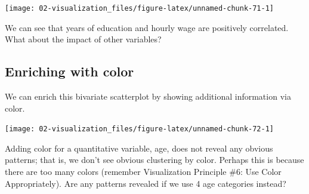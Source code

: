\documentclass[
]{book}
\newenvironment{Shaded}{\begin{snugshade}}{\end{snugshade}}
\newcommand{\DataTypeTok}[1]{\textcolor[rgb]{0.13,0.29,0.53}{#1}}
\newcommand{\KeywordTok}[1]{\textcolor[rgb]{0.13,0.29,0.53}{\textbf{#1}}}
\newcommand{\NormalTok}[1]{#1}
\newcommand{\OperatorTok}[1]{\textcolor[rgb]{0.81,0.36,0.00}{\textbf{#1}}}
\newcommand{\StringTok}[1]{\textcolor[rgb]{0.31,0.60,0.02}{#1}}
\begin{document}
\begin{center}\texttt{[image: 02-visualization\_files/figure-latex/unnamed-chunk-71-1]} \end{center}

We can see that years of education and hourly wage are positively correlated. What about the impact of other variables?

\hypertarget{enriching-with-color}{%
\subsection{Enriching with color}\label{enriching-with-color}}

We can enrich this bivariate scatterplot by showing additional information via color.

\begin{Shaded}
\end{Shaded}

\begin{center}\texttt{[image: 02-visualization\_files/figure-latex/unnamed-chunk-72-1]} \end{center}

Adding color for a quantitative variable, age, does not reveal any obvious patterns; that is, we don't see obvious clustering by color. Perhaps this is because there are too many colors (remember Visualization Principle \#6: Use Color Appropriately). Are any patterns revealed if we use 4 age categories instead?
\end{document}
